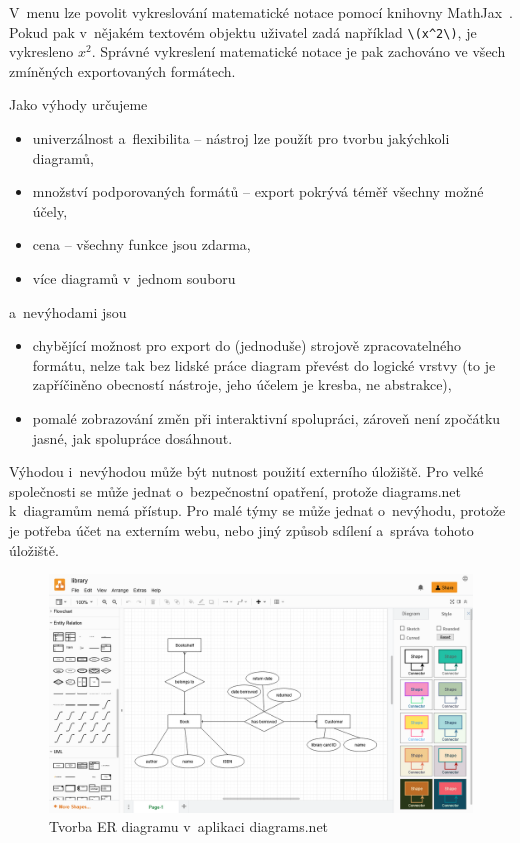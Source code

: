 V~menu  lze povolit vykreslování matematické notace pomocí knihovny MathJax~\cite{mathjaxconsortium_mathjax_2022}.
Pokud pak v~nějakém textovém objektu uživatel zadá například \verb|\(x^2\)|, je vykresleno $x^2$.
Správné vykreslení matematické notace je pak zachováno ve všech zmíněných exportovaných formátech.

Jako výhody určujeme
\begin{itemize}
  \item univerzálnost a~flexibilita -- nástroj lze použít pro tvorbu jakýchkoli diagramů,
  \item množství podporovaných formátů -- export pokrývá téměř všechny možné účely,
  \item cena -- všechny funkce jsou zdarma,
  \item více diagramů v~jednom souboru
\end{itemize}
a~nevýhodami jsou
\begin{itemize}
  \item chybějící možnost pro export do (jednoduše) strojově zpracovatelného formátu, nelze tak bez lidské práce diagram převést do logické vrstvy (to je zapříčiněno obecností nástroje, jeho účelem je kresba, ne abstrakce),
  \item pomalé zobrazování změn při interaktivní spolupráci, zároveň není zpočátku jasné, jak spolupráce dosáhnout.
\end{itemize}

Výhodou i~nevýhodou může být nutnost použití externího úložiště.
Pro velké společnosti se může jednat o~bezpečnostní opatření, protože diagrams.net k~diagramům nemá přístup.
Pro malé týmy se může jednat o~nevýhodu, protože je potřeba účet na externím webu, nebo jiný způsob sdílení a~správa tohoto úložiště.

\begin{figure}
  \centering
  \includegraphics[width = \textwidth]{../img/diagrams.net.png}
  \caption{Tvorba ER diagramu v~aplikaci diagrams.net}
  \label{fig:diagrams.net}
\end{figure}

